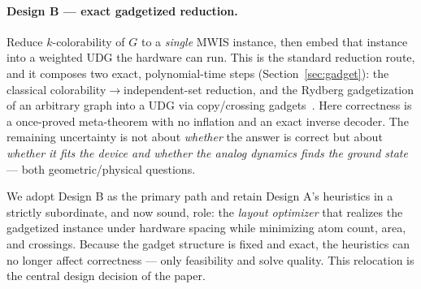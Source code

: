 \documentclass[11pt]{article}
\theoremstyle{definition}
\theoremstyle{remark}
\begin{document}
\paragraph{Design B --- exact gadgetized reduction.} Reduce $k$-colorability of
$G$ to a \emph{single} MWIS instance, then embed that instance into a weighted UDG
the hardware can run. This is the standard reduction route, and it composes two
exact, polynomial-time steps (Section~\ref{sec:gadget}): the classical
colorability$\to$independent-set reduction, and the Rydberg gadgetization of an
arbitrary graph into a UDG via copy/crossing gadgets~\cite{Nguyen2023}. Here
correctness is a once-proved meta-theorem with no inflation and an exact inverse
decoder. The remaining uncertainty is not about \emph{whether} the answer is
correct but about \emph{whether it fits the device and whether the analog
dynamics finds the ground state} --- both geometric/physical questions.

We adopt Design B as the primary path and retain Design A's heuristics in a
strictly subordinate, and now sound, role: the \emph{layout optimizer} that
realizes the gadgetized instance under hardware spacing while minimizing atom
count, area, and crossings. Because the gadget structure is fixed and exact, the
heuristics can no longer affect correctness --- only feasibility and solve
quality. This relocation is the central design decision of the paper.
\end{document}
